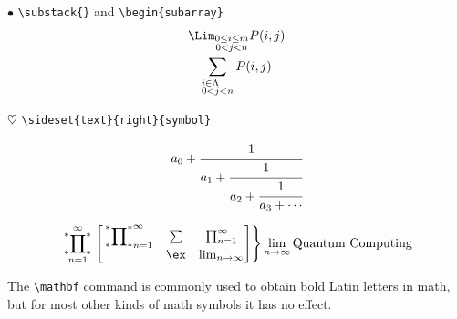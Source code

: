 $\bullet$ \verb|\substack{}| and \verb|\begin{subarray}|
	\begin{gather}
		\Lim_{\substack{0\leq i \leq m\\ 0<j<n} } P(i,j)\\
		\sum_{\begin{subarray}{r}
				i\in \Lambda \\ 0<j<n
		\end{subarray}} P(i,j)
	\end{gather}
	
	$\heartsuit$ \verb|\sideset{text}{right}{symbol}|
	
	\[
	a_0+\cfrac{1}{a_1+\cfrac{1}{a_2+\cfrac{1}{a_3+\cdots}}}
	\]
	
	\begin{equation}
		\sideset{_\ast^\ast}{_\ast^\ast}\prod_{n=1}^{\infty} \left.	\begin{aligned}
			\begin{bmatrix}
				\sideset{_\ast^\ast}{_\ast^\ast}\prod_{n=1}^{\infty} & \sum & \prod_{n=1}^{\infty} \\
				& \ex  & \lim_{n\to \infty}
			\end{bmatrix}
		\end{aligned} \right \rbrace \lim_{n\to \infty} \text{Quantum Computing}
	\end{equation}
	
	The \verb|\mathbf| command is commonly used to obtain bold Latin letters in math, but for most other kinds of math symbols it has no effect.
	
